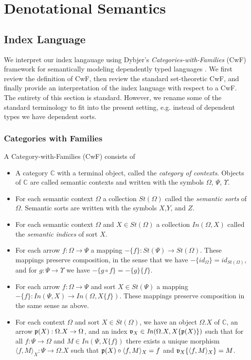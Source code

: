 \documentclass[sigplan,10pt,review,anonymous]{acmart}
\begin{document}
\section{Denotational Semantics}

\subsection{Index Language}

We interpret our index langauage using Dybjer's \emph{Categories-with-Families} (CwF) framework for semantically modeling dependently typed languages \cite{dybjer1995internal}. We first review the definition of CwF, then review the standard set-theoretic CwF, and finally provide an interpretation of the index language with respect to a CwF. The entirety of this section is standard. However, we rename some of the standard terminology to fit into the present setting, e.g. instead of dependent types we have dependent sorts.

\subsubsection{Categories with Families}

A Category-with-Families (CwF) consists of 
\begin{itemize}
\item A category $\mathbb C$ with a terminal object, called the \emph{category of contexts}. Objects of $\mathbb C$ are called semantic contexts and written with the symbols $\Omega$, $\Psi$, $\Upsilon$.
\item For each semantic context $\Omega$ a collection $\mathit{St}(\Omega)$ called the \emph{semantic sorts} of $\Omega$. Semantic sorts are written with the symbols $X$,$Y$, and $Z$.
\item For each semantic context $\Omega$ and $X \in \mathit{St}(\Omega)$ a collection $\mathit{In}(\Omega,X)$ called the \emph{semantic indices} of sort $X$.
\item For each arrow $f : \Omega \to \Psi$ a mapping $- \{ f \} : \mathit{St}(\Psi) \to \mathit{St}(\Omega)$. These mappings preserve composition, in the sense that we have $- \{ \mathit{id}_{\Omega} \} = \mathit{id}_{\mathit{St}(\Omega)}$, and for $g : \Psi \to \Upsilon$ we have $- \{ g \circ f \} = - \{ g \} \{ f \}$.
\item For each arrow $f : \Omega \to \Psi$ and sort $X \in \mathit{St}(\Psi)$ a mapping $- \{ f \} : \mathit{In}(\Psi,X) \to \mathit{In}(\Omega,X \{ f \})$. These mappings preserve composition in the same sense as above.
\item For each context $\Omega$ and sort $X \in \mathit{St}(\Omega)$, we have an object $\Omega . X$ of $\mathbb C$, an arrow $\frak p(X) : \Omega . X \to \Omega$, and an index $\frak v_{X} \in \mathit{In}(\Omega . X, X \{ \frak p(X) \})$ such that for all $f : \Psi \to \Omega$ and $M \in \mathit{In}(\Psi, X \{ f \})$ there exists a unique morphism $\langle f , M \rangle_X : \Psi \to \Omega . X$ such that $\frak p(X) \circ \langle f , M \rangle_X = f$ and $\frak v_{X} \{ \langle f, M \rangle_X \} = M$.
\end{itemize}
\end{document}

